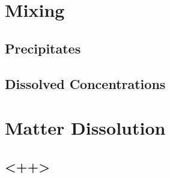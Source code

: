\section{Mixing}

\subsection{Precipitates}

\subsection{Dissolved Concentrations}



\section{Matter Dissolution}
\subsection{ <++> }


